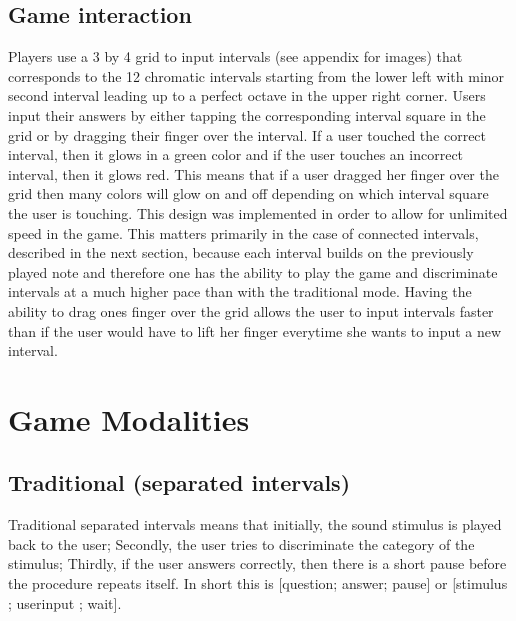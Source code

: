 \subsection{Game interaction}
Players use a 3 by 4 grid to input intervals (see appendix for images) that corresponds to the 12 chromatic intervals starting from the lower left with minor second interval leading up to a perfect octave in the upper right corner. Users input their answers by either tapping the corresponding interval square in the grid or by dragging their finger over the interval. If a user touched the correct interval, then it glows in a green color and if the user touches an incorrect interval, then it glows red. This means that if a user dragged her finger over the grid then many colors will glow on and off depending on which interval square the user is touching. This design was implemented in order to allow for unlimited speed in the game. This matters primarily in the case of connected intervals, described in the next section, because each interval builds on the previously played note and therefore one has the ability to play the game and discriminate intervals at a much higher pace than with the traditional mode. Having the ability to drag ones finger over the grid allows the user
to input intervals faster than if the user would have to lift her finger everytime she wants to input a new interval.




\section{Game Modalities}

\subsection{Traditional (separated intervals)}
Traditional separated intervals means that initially, the sound stimulus is played back to the user; Secondly, the user tries to discriminate the category of the stimulus; Thirdly, if the user answers correctly, then there is a short pause before the procedure repeats itself. In short this is [question; answer; pause] or [stimulus ; userinput ; wait].

